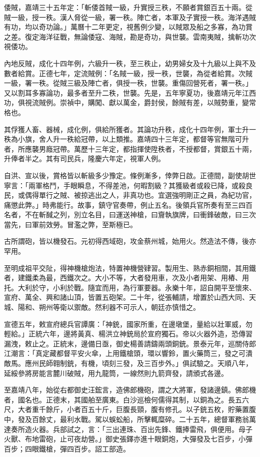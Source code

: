 倭賊，嘉靖三十五年定：「斬倭首賊一級，升實授三秩，不願者賞銀百五十兩。從賊一級，授一秩。漢人脅從一級，署一秩。陣亡者，本軍及子實授一秩。海洋遇賊有功，均以奇功論。」萬曆十二年更定，視舊例少變，以賊眾及船之多寡，為功賞之差。復定海洋征戰，無論倭寇、海賊，勘是奇功，與世襲。雲南夷賊，擒斬功次視倭功。

內地反賊，成化十四年例，六級升一秩，至三秩止，幼男婦女及十九級以上與不及數者給賞。正德七年，定流賊例：「名賊一級，授一秩，世襲，為從者給賞。次賊一級，署一秩。從賊三級及陣亡者，俱授一秩，世襲。重傷回營死者，署一秩。」又以割耳多寡論功，最多者至升二秩，世襲。先是，五年寧夏功，後嘉靖元年江西功，俱視流賊例。崇禎中，購闖、獻以萬金，爵封侯，餘賊有差，以賊勢重，變常格也。

其俘獲人畜、器械，成化例，俱給所獲者。其論功升秩，成化十四年例，軍士升一秩為小旗，舍人升一秩給冠帶，以上類推。嘉靖四十三年定，都督等官無階可升者，所應襲男廕冠帶。萬歷十三年定，都指揮使陞秩者，不授都督，賞銀五十兩，升俸者半之。其有司民兵，隆慶六年定，視軍人例。

自洪、宣以後，賞格皆以斬級多少豫定。條例漸多，倖弊日啟。正德間，副使胡世寧言：「兩軍格鬥，手眼瞬息，不得差池，何暇割級？其獲級者或殺已降，或殺良民，或偶得單行之賊、被掠逃出之人，非真功也。宜選強明剛正之員，為紀功官，痛懲此弊。」時弗能行。故事，鎮守官奏帶，例止五名。後領兵官所奏有至三四百名者，不在斬馘之列，別立名目，曰運送神槍，曰齎執旗牌，曰衝鋒破敵，曰三次當先，曰軍前效勞。冒濫之弊，至斯極已。

古所謂砲，皆以機發石。元初得西域砲，攻金蔡州城，始用火。然造法不傳，後亦罕用。

至明成祖平交阯，得神機槍炮法，特置神機營肄習。製用生、熟赤銅相間，其用鐵者，建鐵柔為最，西鐵次之。大小不等，大者發用車，次及小者用架、用樁、用托。大利於守，小利於戰。隨宜而用，為行軍要器。永樂十年，詔自開平至懷來、宣府、萬全、興和諸山頂，皆置五砲架。二十年，從張輔請，增置於山西大同、天城、陽和、朔州等衛以禦敵。然利器不可示人，朝廷亦慎惜之。

宣德五年，敕宣府總兵官譚廣：「神銃，國家所重，在邊墩堡，量給以壯軍威，勿輕給。」正統六年，邊將黃真、楊洪立神銃局於宣府獨石。帝以火器外造，恐傳習漏洩，敕止之。正統末，邊備日亟，御史楊善請鑄兩頭銅銃。景泰元年，巡關侍郎江潮言：「真定藏都督平安火傘，上用鐵槍頭，環以響鈴，置火藥筒三，發之可潰敵馬。應州民師翱制銃，有機，頃刻三發，及三百步外。」俱試驗之。天順八年，延綏參將房能言麓川破賊，用九龍筒，一線然則九箭齊發，請頒式各邊。

至嘉靖八年，始從右都御史汪鋐言，造佛郎機砲，謂之大將軍，發諸邊鎮。佛郎機者，國名也。正德末，其國舶至廣東。白沙巡檢何儒得其制，以銅為之。長五六尺，大者重千餘斤，小者百五十斤，巨腹長頸，腹有修孔。以子銃五枚，貯藥置腹中，發及百餘丈，最利水戰。駕以蜈蚣船，所擊輒糜碎。二十五年，總督軍務翁萬達奏所造火器。兵部試之，言：「三出連珠、百出先鋒、鐵捧雷飛，俱便用。母子火獸、布地雷砲，止可夜劫營。」御史張鐸亦進十眼銅炮，大彈發及七百步，小彈百步；四眼鐵槍，彈四百步。詔工部造。

